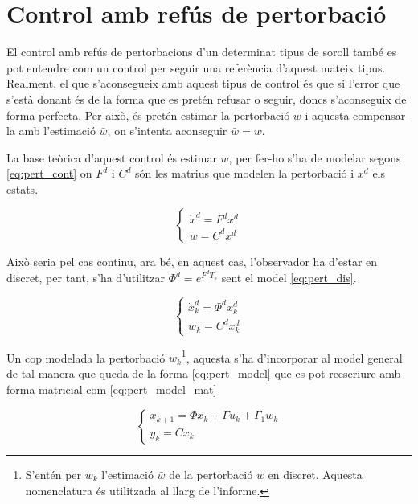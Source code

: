 \documentclass[12pt,a4paper,final,twoside,openright]{report}
\begin{document}
\section{Control amb refús de pertorbació}
\label{sec:pert}

El control amb refús de pertorbacions d'un determinat tipus de soroll també es pot entendre com un control per seguir una referència d'aquest mateix tipus. Realment, el que s'aconsegueix amb aquest tipus de control és que si l'error que s'està donant és de la forma que es pretén refusar o seguir, doncs s'aconseguix de forma perfecta. Per això, és pretén estimar la pertorbació $w$ i aquesta compensar-la amb l'estimació $\bar{w}$, on s'intenta aconseguir $\bar{w}=w$.

La base teòrica d'aquest control és estimar $w$, per fer-ho s'ha de modelar segons \eqref{eq:pert_cont} on $F^d$ i $C^d$ són les matrius que modelen la pertorbació i $x^d$ els estats. 

\begin{equation}\label{eq:pert_cont}
\left\{
\begin{array}{lr}
\dot{x}^d = F^d x^d\\
w=C^d x^d
\end{array}
\right.
\end{equation}

Això seria pel cas continu, ara bé, en aquest cas, l'observador ha d'estar en discret, per tant, s'ha d'utilitzar $\Phi^d=e^{F^d T_s}$ sent el model \eqref{eq:pert_dis}.

\begin{equation}\label{eq:pert_dis}
\left\{
\begin{array}{lr}
\dot{x}^d_k = \Phi^d x^d_k\\
w_k=C^d x^d_k
\end{array}
\right.
\end{equation}

Un cop modelada la pertorbació $w_k$\footnote{S'entén per $w_k$ l'estimació $\bar{w}$ de la pertorbació $w$ en discret. Aquesta nomenclatura és utilitzada al llarg de l'informe.}, aquesta s'ha d'incorporar al model general de tal manera que queda de la forma \eqref{eq:pert_model} que es pot reescriure amb forma matricial com \eqref{eq:pert_model_mat}

\vspace{-19pt}
\begin{equation}\label{eq:pert_model}
\left\{
\begin{array}{lr}
x_{k+1} = \Phi x_k + \Gamma u_k + \Gamma_1 w_k\\
y_k=C x_k
\end{array}
\right.
\end{equation}
\end{document}
